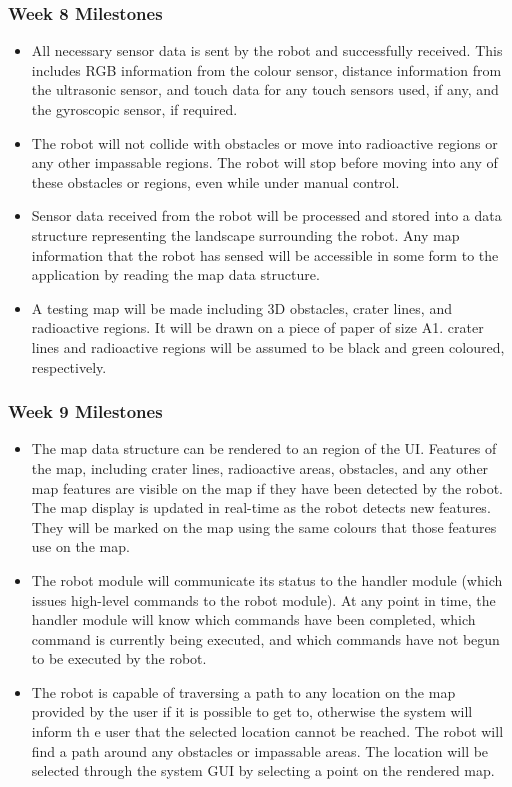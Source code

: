 \documentclass[12pt,a4paper]{article}
\begin{document}
	\subsubsection{Week 8 Milestones}
    \begin{itemize}
    	\item All necessary sensor data is sent by the robot and successfully received. This includes RGB information from the colour sensor, distance information from the ultrasonic sensor, and touch data for any touch sensors used, if any, and the gyroscopic sensor, if required.
        \item The robot will not collide with obstacles or move into radioactive regions or any other impassable regions. The robot will stop before moving into any of these obstacles or regions, even while under manual control.
        \item Sensor data received from the robot will be processed and stored into a data structure representing the landscape surrounding the robot. Any map information that the robot has sensed will be accessible in some form to the application by reading the map data structure.
        \item A testing map will be made including 3D obstacles, crater lines, and radioactive regions. It will be drawn on a piece of paper of size A1. crater lines and radioactive regions will be assumed to be black and green coloured, respectively.
    \end{itemize}
    \subsubsection{Week 9 Milestones}
    \begin{itemize}
    	\item The map data structure can be rendered to an region of the UI. Features of the map, including crater lines, radioactive areas, obstacles, and any other map features are visible on the map if they have been detected by the robot. The map display is updated in real-time as the robot detects new features. They will be marked on the map using the same colours that those features use on the map.
        \item The robot module will communicate its status to the handler module (which issues high-level commands to the robot module). At any point in time, the handler module will know which commands have been completed, which command is currently being executed, and which commands have not begun to be executed by the robot.
        \item The robot is capable of traversing a path to any location on the map provided by the user if it is possible to get to, otherwise the system will inform th e user that the selected location cannot be reached. The robot will find a path around any obstacles or impassable areas. The location will be selected through the system GUI by selecting a point on the rendered map.
    \end{itemize}
\end{document}
